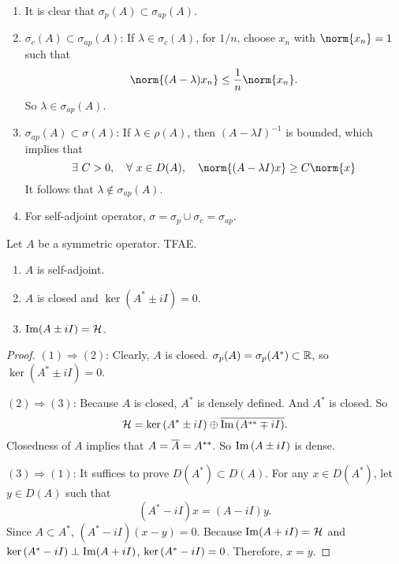 \documentclass[a4paper,12pt]{article}
\begin{document}
\begin{rmk}
    \begin{enumerate}[label=(\roman*)]
        \item It is clear that $\sigma_p(A) \subset \sigma_{ap}(A)$.
        \item $\sigma_c(A) \subset \sigma_{ap}(A)$: If $\lambda \in \sigma_c(A)$, for $1/n$, choose $x_n$ with $\norm{x_n} = 1$ such that
        \begin{equation*}
            \norm{(A - \lambda)x_n} \leq \frac{1}{n} \norm{x_n}.
        \end{equation*}
        So $\lambda \in \sigma_{ap}(A)$.
        \item $\sigma_{ap}(A) \subset \sigma(A)$: If $\lambda \in \rho(A)$, then $(A - \lambda I)^{-1}$ is bounded, which implies that
        \begin{equation*}
            \exists~C > 0,\quad \forall~x\in D(A),\quad \norm{(A - \lambda I)x} \geq C\norm{x}
        \end{equation*}
        It follows that $\lambda \notin \sigma_{ap}(A)$.
        \item For self-adjoint operator, $\sigma = \sigma_p \cup \sigma_c = \sigma_{ap}$.
    \end{enumerate}
\end{rmk}

\begin{thm}
    Let $A$ be a symmetric operator. TFAE.
    \begin{enumerate}[label=(\arabic{*})]
        \item $A$ is self-adjoint.
        \item $A$ is closed and $\ker (A^* \pm iI) = 0$.
        \item $\operatorname{Im} (A \pm iI) = \mathcal{H}$.
    \end{enumerate}
\end{thm}
\begin{proof}
    $(1) \Rightarrow (2)$: Clearly, $A$ is closed. $\sigma_p(A) = \sigma_p(A^*) \subset \mathbb{R}$, so $\ker (A^* \pm iI) = 0$.

    $(2) \Rightarrow (3)$: Because $A$ is closed, $A^*$ is densely defined. And $A^*$ is closed. So 
    \begin{equation*}
        \mathcal{H} = \ker \left(A^* \pm i I\right) \oplus \overline{\operatorname{Im} \left(A^{**} \mp iI\right)}.
    \end{equation*}
    Closedness of $A$ implies that $A = \overline{A} = A^{**}$. So $\operatorname{Im} \left(A\pm iI\right)$ is dense.

    $(3) \Rightarrow (1)$: It suffices to prove $D(A^*) \subset D(A)$. For any $x \in D(A^*)$, let $y \in D(A)$ such that
    \begin{equation*}
        (A^* - iI)x = (A - iI)y.
    \end{equation*}
    Since $A \subset A^*$, $(A^* - iI)(x - y) = 0$. Because $\operatorname{Im} (A + iI) = \mathcal{H}$ and $\ker \left(A^* - iI\right) \perp \operatorname{Im} (A + iI)$, $\ker \left(A^* - iI\right) = 0$. Therefore, $x = y$.
\end{proof}
\end{document}
